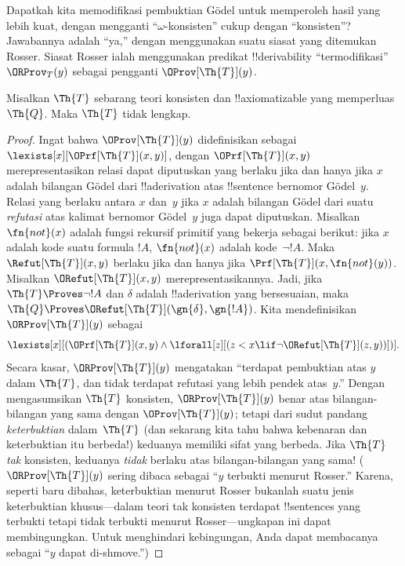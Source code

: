 \documentclass[../../../include/open-logic-section]{subfiles}
\begin{document}


Dapatkah kita memodifikasi pembuktian G\"odel untuk memperoleh hasil yang
lebih kuat, dengan mengganti ``$\omega$-konsisten'' cukup dengan
``konsisten''? Jawabannya adalah ``ya,'' dengan menggunakan suatu siasat yang
ditemukan Rosser. Siasat Rosser ialah menggunakan predikat !!{derivability}
``termodifikasi'' $\ORProv_T(y)$ sebagai pengganti $\OProv[\Th{T}](y)$.

\begin{thm}
Misalkan $\Th{T}$ sebarang teori konsisten dan !!{axiomatizable} yang
memperluas $\Th{Q}$. Maka $\Th{T}$ tidak lengkap.
\end{thm}

\begin{proof}
Ingat bahwa $\OProv[\Th{T}](y)$ didefinisikan sebagai
$\lexists[x][\OPrf[\Th{T}](x,y)]$, dengan $\OPrf[\Th{T}](x,y)$
merepresentasikan relasi dapat diputuskan yang berlaku jika dan hanya jika
$x$ adalah bilangan G\"odel dari !!a{derivation} atas !!{sentence} bernomor
G\"odel~$y$. Relasi yang berlaku antara $x$ dan~$y$ jika $x$ adalah bilangan
G\"odel dari suatu \emph{refutasi} atas kalimat bernomor G\"odel~$y$ juga
dapat diputuskan. Misalkan $\fn{not}(x)$ adalah fungsi rekursif primitif yang
bekerja sebagai berikut: jika $x$ adalah kode suatu formula $!A$,
$\fn{not}(x)$ adalah kode~$\lnot !A$. Maka $\Refut[\Th{T}](x,y)$ berlaku jika
dan hanya jika $\Prf[\Th{T}](x,\fn{not}(y))$. Misalkan
$\ORefut[\Th{T}](x,y)$ merepresentasikannya. Jadi, jika
$\Th{T} \Proves \lnot !A$ dan $\delta$ adalah !!a{derivation} yang
bersesuaian, maka $\Th{Q} \Proves \ORefut[\Th{T}](\gn{\delta},\gn{!A})$.
Kita mendefinisikan $\ORProv[\Th{T}](y)$ sebagai
\[
\lexists[x][(\OPrf[\Th{T}](x,y) \land \lforall[z][(z < x \lif \lnot
  \ORefut[\Th{T}](z,y))])].
\]
Secara kasar, $\ORProv[\Th{T}](y)$ mengatakan ``terdapat pembuktian atas
$y$ dalam $\Th{T}$, dan tidak terdapat refutasi yang lebih pendek
atas~$y$.'' Dengan mengasumsikan $\Th{T}$ konsisten,
$\ORProv[\Th{T}](y)$ benar atas bilangan-bilangan yang sama dengan
$\OProv[\Th{T}](y)$; tetapi dari sudut pandang \emph{keterbuktian}
dalam~$\Th{T}$ (dan sekarang kita tahu bahwa kebenaran dan keterbuktian itu
berbeda!) keduanya memiliki sifat yang berbeda. Jika $\Th{T}$
\emph{tak} konsisten, keduanya \emph{tidak} berlaku atas bilangan-bilangan
yang sama!{} ($\ORProv[\Th{T}](y)$ sering dibaca sebagai ``$y$ terbukti
menurut Rosser.'' Karena, seperti baru dibahas, keterbuktian menurut Rosser
bukanlah suatu jenis keterbuktian khusus---dalam teori tak konsisten terdapat
!!{sentence}s yang terbukti tetapi tidak terbukti menurut Rosser---ungkapan
ini dapat membingungkan. Untuk menghindari kebingungan, Anda dapat membacanya
sebagai ``$y$ dapat di-shmove.'')


\end{proof}
\end{document}
